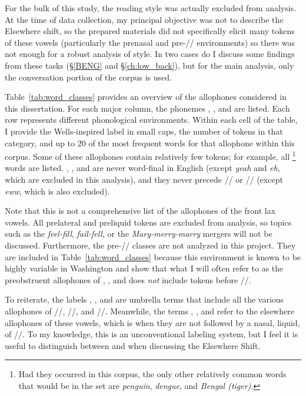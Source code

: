 For the bulk of this study, the reading style was actually excluded from analysis. At the time of data collection, my principal objective was not to describe the Elsewhere shift, so the prepared materials did not specifically elicit many tokens of these vowels (particularly the prenasal and pre-// environments) so there was not enough for a robust analysis of style. In two cases do I discuss some findings from these tasks (\S\ref{BENG} and \S\ref{ch:low_back}), but for the main analysis, only the conversation portion of the corpus is used.



Table~\ref{tab:word_classes} provides an overview of the allophones considered in this dissertation. For each major column, the phonemes \trap, \dress, and \kit are listed. Each row represents different phonological environments. Within each cell of the table, I provide the Wells-inspired label in small caps, the number of tokens in that category, and up to 20 of the most frequent words for that allophone within this corpus. Some of these allophones contain relatively few tokens; for example, all \beng\footnote{Had they occurred in this corpus, the only other relatively common words that would be in the \beng set are \textit{penguin}, \textit{dengue}, and \textit{Bengal (tiger)}.} words are listed. \trap, \dress, and \kit are never word-final in English (except \textit{yeah} and \textit{eh}, which are excluded in this analysis), and they never precede // or // (except \textit{eww}, which is also excluded).

Note that this is not a comprehensive list of the allophones of the front lax vowels. All prelateral and preliquid tokens are excluded from analysis, so topics such as the \textit{feel-fill}, \textit{fail-fell}, or the \textit{Mary-merry-marry} mergers will not be discussed. Furthermore, the pre-// classes are not analyzed in this project. They are included in Table~\ref{tab:word_classes} because this environment is known to be highly variable in Washington \citep{wassink_etal_2009, wassink_2015, wassink_2016_pads, stanley_2017_ADS} and show that what I will often refer to as the preobstruent allophones of \trap, \dress, and \kit does \textit{not} include tokens before //.

To reiterate, the labels \trap, \dress, and \kit are umbrella terms that include all the various allophones of /\textipa{\ae}/, //, and //. Meanwhile, the terms \bat, \bet, and \bit refer to the elsewhere allophones of these vowels, which is when they are not followed by a nasal, liquid, of //. To my knowledge, this is an unconventional labeling system, but I feel it is useful to distinguish between \trap and \bat when discussing the Elsewhere Shift.

